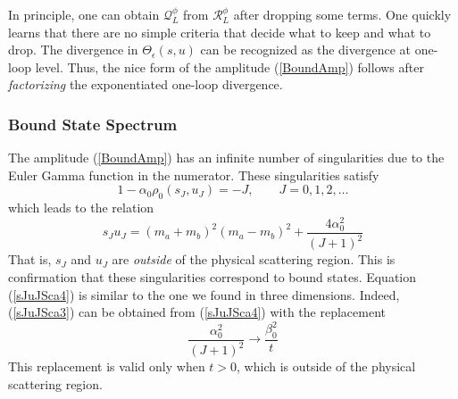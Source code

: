 In principle, one can obtain $\mathcal{Q}_{L}^{\phi}$ from $\mathcal{R}_{L}^{\phi}$ after dropping some terms. One quickly learns that there are no simple criteria that decide what to keep and what to drop. The divergence in $\Theta_{\epsilon}(s, u)$ can be recognized as the divergence at one-loop level. Thus, the nice form of the amplitude (\ref{BoundAmp}) follows after \textit{factorizing} the exponentiated one-loop divergence.
\subsubsection{Bound State Spectrum}
The amplitude (\ref{BoundAmp}) has an infinite number of singularities due to the Euler Gamma function in the numerator. These singularities satisfy
\begin{equation}
	1 - \alpha_{0} \rho_{0}(s_{J}, u_{J}) = -J, \qquad J = 0, 1, 2, \ldots \label{ScaSings}
\end{equation}
which leads to the relation
\begin{equation}
	s_{J} u_{J} = (m_{a} + m_{b})^{2} (m_{a} - m_{b})^{2} + \frac{4\alpha_{0}^{2}}{(J + 1)^{2}} \label{sJuJSca4}
\end{equation}
That is, $s_{J}$ and $u_{J}$ are \textit{outside} of the physical scattering region. This is confirmation that these singularities correspond to bound states. Equation (\ref{sJuJSca4}) is similar to the one we found in three dimensions. Indeed, (\ref{sJuJSca3}) can be obtained from (\ref{sJuJSca4}) with the replacement
\begin{equation}
	\frac{\alpha_{0}^{2}}{(J+1)^{2}} \longrightarrow \frac{\beta_{0}^{2}}{t}
\end{equation}
This replacement is valid only when $t > 0$, which is outside of the physical scattering region.


